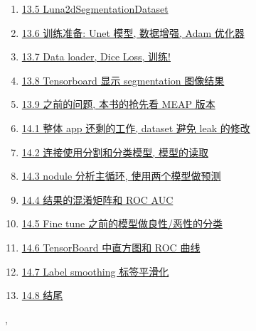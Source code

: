 \documentclass[11pt]{article}
\renewcommand{\today}{\shortmonthname[\the\month] \the \day,  \the\year}
\begin{document}
\begin{enumerate}
	\item \href{https://mp.weixin.qq.com/s/1OjKDD8oJY0sI6kAERE10A}{13.5 Luna2dSegmentationDataset}	%
	\item \href{https://mp.weixin.qq.com/s/-JjDf_BtB53sCdyLgIvmxg}{13.6 训练准备: Unet 模型, 数据增强, Adam 优化器}	%
	\item \href{https://mp.weixin.qq.com/s/Fplkh2gBhFT7jqjaGMf-pA}{13.7 Data loader, Dice Loss, 训练!}	%
	\item \href{https://mp.weixin.qq.com/s/iXBZWaESuz5-RnxLDZmnIg}{13.8 Tensorboard 显示 segmentation 图像结果}	%
	\item \href{https://mp.weixin.qq.com/s/PxIMdRbtdxER8dASkXd3Hg}{13.9 之前的问题, 本书的抢先看 MEAP 版本}	%
	\item \href{https://mp.weixin.qq.com/s/OqWj7TkOxfxr-AmBWQgU7w}{14.1 整体 app 还剩的工作, dataset 避免 leak 的修改}	%
	\item \href{https://mp.weixin.qq.com/s/ncCBnC5OcjYccLQypv-6VQ}{14.2 连接使用分割和分类模型, 模型的读取}	%
	\item \href{https://mp.weixin.qq.com/s/aUyxMsG5CVsbUGOUGUXAxA}{14.3 nodule 分析主循环, 使用两个模型做预测}	%
	\item \href{https://mp.weixin.qq.com/s/4QbW1jKzunJRagQHA40usQ}{14.4 结果的混淆矩阵和 ROC AUC}	%
	\item \href{https://mp.weixin.qq.com/s/BhvLHM3M-IxPSTXmYfIMfQ}{14.5 Fine tune 之前的模型做良性/恶性的分类}	%
	\item \href{https://mp.weixin.qq.com/s/14XGf6vGCA1_7hyu0I5fmQ}{14.6 TensorBoard 中直方图和 ROC 曲线}	%
	\item \href{https://mp.weixin.qq.com/s/FAuBkJb-HGrYgvNE63rscw}{14.7 Label smoothing 标签平滑化}	%
	\item \href{https://mp.weixin.qq.com/s/r42qBNtzC1Yb_EXiORQj1w}{14.8 结尾}	%
\end{enumerate}




%
\begin{flushright}
	\tiny \today 
\end{flushright}
\end{document}
